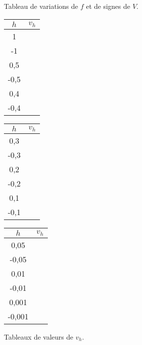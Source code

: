 \newpage

\begin{figure}[h]
	\centering	
	\caption{Tableau de variations de $f$ et de signes de $V$.}
	\label{fig:var-signe}
\end{figure}

\begin{figure}[h]
	\centering
	\begin{tabular}{|c|c|}\hline
		$h$ & $v_h$ \\ \hline
		1 & \hspace{2cm} \\ \hline
		-1 & \\ \hline
		0,5 & \\ \hline
		-0,5 & \\ \hline
		0,4 & \\ \hline
		-0,4 & \\ \hline
	\end{tabular}
	\hfill
	\begin{tabular}{|c|c|}\hline
		$h$ & $v_h$ \\ \hline
		0,3 & \hspace{2cm} \\ \hline
		-0,3 & \\ \hline
		0,2 & \\ \hline
		-0,2 & \\ \hline
		0,1 & \\ \hline
		-0,1 & \\ \hline
	\end{tabular}
	\hfill
	\begin{tabular}{|c|c|}\hline
		$h$ & $v_h$ \\ \hline
		0,05 & \hspace{2cm} \\ \hline
		-0,05 & \\ \hline
		0,01 & \\ \hline
		-0,01 & \\ \hline
		0,001 & \\ \hline
		-0,001 & \\ \hline
	\end{tabular}
	\caption{Tableaux de valeurs de $v_h$.}
	\label{fig:vh}
\end{figure}

%

